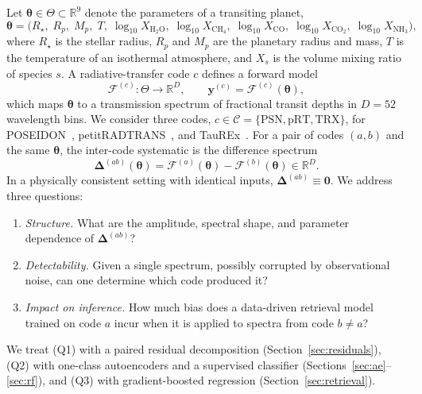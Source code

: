 Let $\bm{\theta}\in\Theta\subset\mathbb{R}^{9}$ denote the parameters of a transiting planet,
\begin{equation}
  \bm{\theta} = \bigl(R_\star,\; R_p,\; M_p,\; T,\; \log_{10}X_{\mathrm{H_2O}},\; \log_{10}X_{\mathrm{CH_4}},\; \log_{10}X_{\mathrm{CO}},\; \log_{10}X_{\mathrm{CO_2}},\; \log_{10}X_{\mathrm{NH_3}}\bigr),
  \label{eq:theta}
\end{equation}
where $R_\star$ is the stellar radius, $R_p$ and $M_p$ are the planetary radius and mass, $T$ is the temperature of an isothermal atmosphere, and $X_s$ is the volume mixing ratio of species $s$.
A radiative-transfer code $c$ defines a forward model
\begin{equation}
  \mathcal{F}^{(c)}:\Theta\rightarrow\mathbb{R}^{D},\qquad \mathbf{y}^{(c)} = \mathcal{F}^{(c)}(\bm{\theta}),
  \label{eq:forward}
\end{equation}
which maps $\bm{\theta}$ to a transmission spectrum of fractional transit depths in $D=52$ wavelength bins.
We consider three codes, $c\in\mathcal{C}=\{\mathrm{PSN},\mathrm{pRT},\mathrm{TRX}\}$, for POSEIDON~\cite{TODO_macdonald_poseidon}, petitRADTRANS~\cite{TODO_molliere_petitradtrans}, and TauREx~\cite{TODO_alrefaie_taurex3}.
For a pair of codes $(a,b)$ and the same $\bm{\theta}$, the inter-code systematic is the difference spectrum
\begin{equation}
  \bm{\Delta}^{(ab)}(\bm{\theta}) = \mathcal{F}^{(a)}(\bm{\theta}) - \mathcal{F}^{(b)}(\bm{\theta}) \in \mathbb{R}^{D}.
  \label{eq:delta}
\end{equation}
In a physically consistent setting with identical inputs, $\bm{\Delta}^{(ab)}\equiv\mathbf{0}$.
We address three questions:
\begin{enumerate}
  \item[(Q1)] \emph{Structure.} What are the amplitude, spectral shape, and parameter dependence of $\bm{\Delta}^{(ab)}$?
  \item[(Q2)] \emph{Detectability.} Given a single spectrum, possibly corrupted by observational noise, can one determine which code produced it?
  \item[(Q3)] \emph{Impact on inference.} How much bias does a data-driven retrieval model trained on code $a$ incur when it is applied to spectra from code $b\neq a$?
\end{enumerate}
We treat (Q1) with a paired residual decomposition (Section~\ref{sec:residuals}), (Q2) with one-class autoencoders and a supervised classifier (Sections~\ref{sec:ae}--\ref{sec:rf}), and (Q3) with gradient-boosted regression (Section~\ref{sec:retrieval}).

